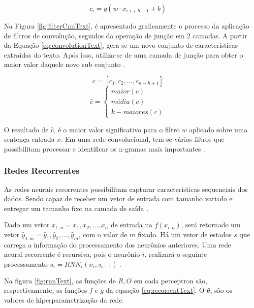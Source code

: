 \begin{equation}
	\label{eq:convolutionText}
	c_{i} = g(w \cdot x_{i:i+h-1} + b)
\end{equation}

Na Figura \ref{fig:filterCnnText}, é apresentado graficamente o processo da aplicação de filtros de convolução, seguidos da operação de junção em 2 camadas. A partir da Equação \ref{eq:convolutionText}, gera-se um novo conjunto de características extraídas do texto. Após isso, utiliza-se de uma camada de junção para obter o maior valor daquele novo sub conjunto \cite{KIM2014}.

$$c = [ c_{1}, c_{2}, ..., c_{n-h+1} ]$$
\begin{equation}
	\hat{c} = 
    \begin{cases}
    	maior(c) \\
        média(c) \\
        k-maiores(c) 
    \end{cases}
\end{equation}

O resultado de $\hat{c}$, é o maior valor significativo para o filtro $w$ aplicado sobre uma sentença entrada $x$. Em uma rede convolucional, tem-se vários filtros que possibilitam processar \cite{KIM2014} e identificar os n-gramas mais importantes \cite{GOLDBERG2017}.

\subsubsection{Redes Recorrentes}

As redes neurais recorrentes possibilitam capturar características sequenciais dos dados. Sendo capaz de receber um vetor de entrada com tamanho variado e entregar um tamanho fixo na camada de saída \cite{GOLDBERG2017}.

Dado um vetor $x_{1:n} = x_{1}, x_{2}, ..., x_{n}$ de entrada na $f(x_{i:n})$, será retornado um vetor $\hat{y}_{1:m} = \hat{y}_{1}, \hat{y}_{2}, ..., \hat{y}_{m}$, com o valor de $m$ fixado. Há um vetor de estados $s$ que carrega a informação do processamento dos neurônios anteriores. Uma rede neural recorrente é recursiva, pois o neurônio $i$, realizará o seguinte processamento $s_{i} = RNN_{i}(x_{i}, s_{i-1})$ \cite{MIKOLOV2010}.

Na figura \ref{fig:rnnText}, as funções de $R, O$ em cada perceptron são, respectivamente, as funções $f$ e $g$ da equação \ref{eq:recorrentText}. O $\theta$, são os valores de hiperparametrização da rede.

